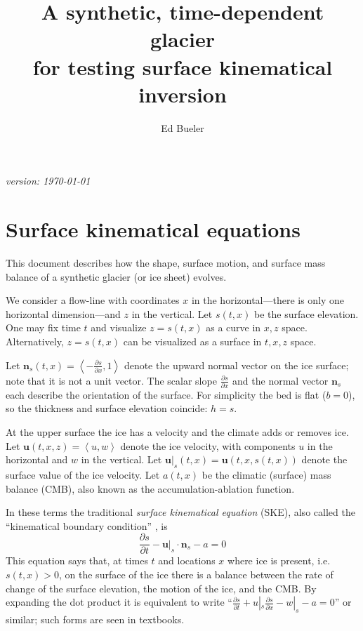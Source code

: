 \documentclass[letterpaper,final,12pt,reqno]{amsart}
\newcommand{\bn}{\mathbf{n}}
\newcommand{\bu}{\mathbf{u}}
\begin{document}

\title[Synthetic, time-dependent glacier]{A synthetic, time-dependent glacier \\ for testing surface kinematical inversion}

\author{Ed Bueler}

\maketitle

\begin{center}
{\footnotesize
\emph{version: \today}}
\end{center}

\thispagestyle{empty}

\section{Surface kinematical equations}  This document describes how the shape, surface motion, and surface mass balance of a synthetic glacier (or ice sheet) evolves.

We consider a flow-line with coordinates $x$ in the horizontal---there is only one horizontal dimension---and $z$ in the vertical.  Let $s(t,x)$ be the surface elevation.  One may fix time $t$ and visualize $z=s(t,x)$ as a curve in $x,z$ space.  Alternatively, $z=s(t,x)$ can be visualized as a surface in $t,x,z$ space.

Let $\bn_s(t,x) = \left<-\frac{\partial s}{\partial x},1\right>$ denote the upward normal vector on the ice surface; note that it is not a unit vector.  The scalar slope $\frac{\partial s}{\partial x}$ and the normal vector $\bn_s$ each describe the orientation of the surface.  For simplicity the bed is flat ($b=0$), so the thickness and surface elevation coincide: $h=s$.

At the upper surface the ice has a velocity and the climate adds or removes ice.  Let $\bu(t,x,z)=\left<u,w\right>$ denote the ice velocity, with components $u$ in the horizontal and $w$ in the vertical.  Let $\bu|_s(t,x) = \bu(t,x,s(t,x))$ denote the surface value of the ice velocity.  Let $a(t,x)$ be the climatic (surface) mass balance (CMB), also known as the accumulation-ablation function.

In these terms the traditional \emph{surface kinematical equation} (SKE), also called the ``kinematical boundary condition'' \cite{FowlerNg2021,GreveBlatter2009}, is
\begin{equation}
\frac{\partial s}{\partial t} - \bu|_s \cdot \bn_s - a = 0  \label{ske}
\end{equation}
This equation says that, at times $t$ and locations $x$ where ice is present, i.e.~$s(t,x)>0$, on the surface of the ice there is a balance between the rate of change of the surface elevation, the motion of the ice, and the CMB.  By expanding the dot product it is equivalent to write ``$\frac{\partial s}{\partial t} + u|_s \frac{\partial s}{\partial x} - w|_s - a = 0$'' or similar; such forms are seen in textbooks.
\end{document}
